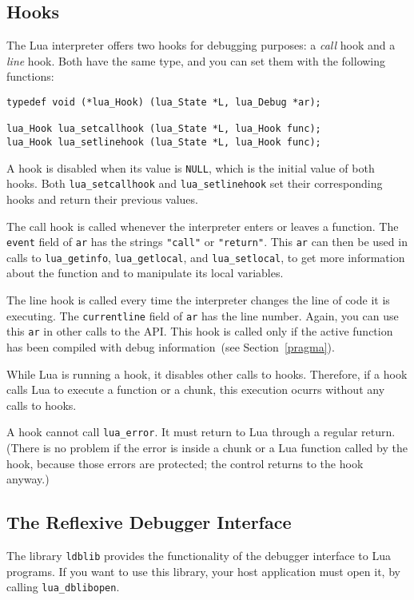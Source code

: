 \documentclass[11pt]{article}
\newcommand{\See}[1]{Section~\ref{#1}}
\newcommand{\see}[1]{(see \See{#1})}
\newcommand{\T}[1]{{\tt #1}}
\newcommand{\Deffunc}[1]{\index{#1}}
\begin{document}
\subsection{Hooks}

The Lua interpreter offers two hooks for debugging purposes:
a \emph{call} hook and a \emph{line} hook.
Both have the same type, and you can set them with the
following functions:
\Deffunc{lua_Hook}\Deffunc{lua_setcallhook}\Deffunc{lua_setlinehook}
\begin{verbatim}
typedef void (*lua_Hook) (lua_State *L, lua_Debug *ar);

lua_Hook lua_setcallhook (lua_State *L, lua_Hook func);
lua_Hook lua_setlinehook (lua_State *L, lua_Hook func);
\end{verbatim}
A hook is disabled when its value is \verb|NULL|,
which is the initial value of both hooks.
Both \verb|lua_setcallhook| and \verb|lua_setlinehook|
set their corresponding hooks and return their previous values.

The call hook is called whenever the
interpreter enters or leaves a function.
The \verb|event| field of \verb|ar| has the strings \verb|"call"|
or \verb|"return"|.
This \verb|ar| can then be used in calls to \verb|lua_getinfo|,
\verb|lua_getlocal|, and \verb|lua_setlocal|,
to get more information about the function and to manipulate its
local variables.

The line hook is called every time the interpreter changes
the line of code it is executing.
The \verb|currentline| field of \verb|ar| has the line number.
Again, you can use this \verb|ar| in other calls to the API.
This hook is called only if the active function
has been compiled with debug information~\see{pragma}.

While Lua is running a hook, it disables other calls to hooks.
Therefore, if a hook calls Lua to execute a function or a chunk,
this execution ocurrs without any calls to hooks.

A hook cannot call \T{lua_error}.
It must return to Lua through a regular return.
(There is no problem if the error is inside a chunk or a Lua function
called by the hook, because those errors are protected;
the control returns to the hook anyway.)


\subsection{The Reflexive Debugger Interface}

The library \verb|ldblib| provides
the functionality of the debugger interface to Lua programs.
If you want to use this library,
your host application must open it,
by calling \verb|lua_dblibopen|.
\end{document}
